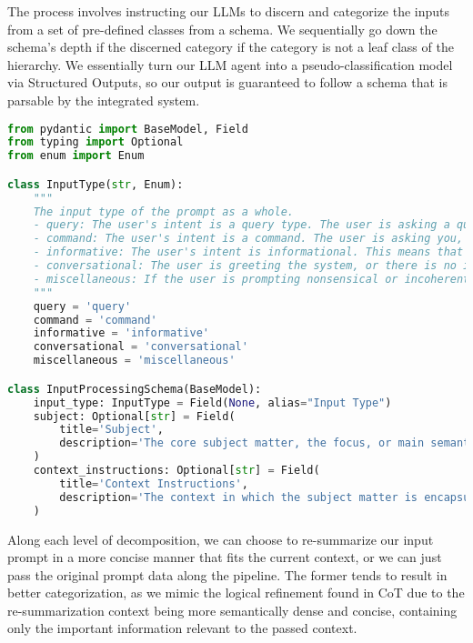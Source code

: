The process involves instructing our LLMs to discern and categorize the inputs from a set of pre-defined classes from a schema. We sequentially go down the schema's depth if the discerned category if the category is not a leaf class of the hierarchy. We essentially turn our LLM agent into a pseudo-classification model via Structured Outputs, so our output is guaranteed to follow a schema that is parsable by the integrated system.

\begin{lstlisting}[language=Python, frame=single, caption=Schema Implementation of Depth 1 (from Figure 2) using Python.]
from pydantic import BaseModel, Field
from typing import Optional
from enum import Enum

class InputType(str, Enum):
    """
    The input type of the prompt as a whole.
    - query: The user's intent is a query type. The user is asking a question or wishes to acquire information.
    - command: The user's intent is a command. The user is asking you, the system to perform a task.
    - informative: The user's intent is informational. This means that the user is trying to inform you, the system, a piece of context or information.
    - conversational: The user is greeting the system, or there is no intrinsic subject or topic within the user's prompt. 
    - miscellaneous: If the user is prompting nonsensical or incoherent inputs.
    """
    query = 'query'
    command = 'command'
    informative = 'informative'
    conversational = 'conversational'
    miscellaneous = 'miscellaneous'

class InputProcessingSchema(BaseModel):
    input_type: InputType = Field(None, alias="Input Type")
    subject: Optional[str] = Field(
        title='Subject',
        description='The core subject matter, the focus, or main semantic idea of the prompt. This is the area of interest that the user has provided.'
    )
    context_instructions: Optional[str] = Field(
        title='Context Instructions',
        description='The context in which the subject matter is encapsulated in. This includes what the user has instructed to you, the system.'
    )
\end{lstlisting}

Along each level of decomposition, we can choose to re-summarize our input prompt in a more concise manner that fits the current context, or we can just pass the original prompt data along the pipeline. The former tends to result in better categorization, as we mimic the logical refinement found in CoT due to the re-summarization context being more semantically dense and concise, containing only the important information relevant to the passed context. 

